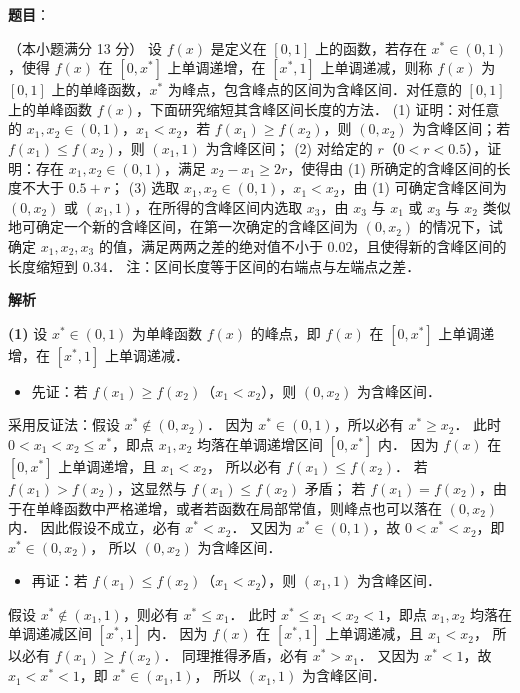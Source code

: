 \begin{answer}

\textbf{题目}：

（本小题满分 13 分）
设 $f(x)$ 是定义在 $[0, 1]$ 上的函数，若存在 $x^* \in (0, 1)$，使得 $f(x)$ 在 $[0, x^*]$ 上单调递增，在 $[x^*, 1]$ 上单调递减，则称 $f(x)$ 为 $[0, 1]$ 上的单峰函数，$x^*$ 为峰点，包含峰点的区间为含峰区间．对任意的 $[0, 1]$ 上的单峰函数 $f(x)$，下面研究缩短其含峰区间长度的方法．
(1) 证明：对任意的 $x_1, x_2 \in (0, 1)$，$x_1 < x_2$，若 $f(x_1) \geqslant f(x_2)$，则 $(0, x_2)$ 为含峰区间；若 $f(x_1) \leqslant f(x_2)$，则 $(x_1, 1)$ 为含峰区间；
(2) 对给定的 $r$（$0 < r < 0.5$），证明：存在 $x_1, x_2 \in (0, 1)$，满足 $x_2 - x_1 \geqslant 2r$，使得由 (1) 所确定的含峰区间的长度不大于 $0.5 + r$；
(3) 选取 $x_1, x_2 \in (0, 1)$，$x_1 < x_2$，由 (1) 可确定含峰区间为 $(0, x_2)$ 或 $(x_1, 1)$，在所得的含峰区间内选取 $x_3$，由 $x_3$ 与 $x_1$ 或 $x_3$ 与 $x_2$ 类似地可确定一个新的含峰区间，在第一次确定的含峰区间为 $(0, x_2)$ 的情况下，试确定 $x_1, x_2, x_3$ 的值，满足两两之差的绝对值不小于 $0.02$，且使得新的含峰区间的长度缩短到 $0.34$．
注：区间长度等于区间的右端点与左端点之差．

\textbf{解析}

\textbf{(1)}
设 $x^* \in (0, 1)$ 为单峰函数 $f(x)$ 的峰点，即 $f(x)$ 在 $[0, x^*]$ 上单调递增，在 $[x^*, 1]$ 上单调递减．
\begin{itemize}
\item 先证：若 $f(x_1) \geqslant f(x_2)$（$x_1 < x_2$），则 $(0, x_2)$ 为含峰区间．
\end{itemize}
  采用反证法：假设 $x^* \notin (0, x_2)$．
  因为 $x^* \in (0, 1)$，所以必有 $x^* \geqslant x_2$．
  此时 $0 < x_1 < x_2 \leqslant x^*$，即点 $x_1, x_2$ 均落在单调递增区间 $[0, x^*]$ 内．
  因为 $f(x)$ 在 $[0, x^*]$ 上单调递增，且 $x_1 < x_2$，
  所以必有 $f(x_1) \leqslant f(x_2)$．
  若 $f(x_1) > f(x_2)$，这显然与 $f(x_1) \leqslant f(x_2)$ 矛盾；
  若 $f(x_1) = f(x_2)$，由于在单峰函数中严格递增，或者若函数在局部常值，则峰点也可以落在 $(0, x_2)$ 内．
  因此假设不成立，必有 $x^* < x_2$．
  又因为 $x^* \in (0, 1)$，故 $0 < x^* < x_2$，即 $x^* \in (0, x_2)$，
  所以 $(0, x_2)$ 为含峰区间．
\begin{itemize}
\item 再证：若 $f(x_1) \leqslant f(x_2)$（$x_1 < x_2$），则 $(x_1, 1)$ 为含峰区间．
\end{itemize}
  假设 $x^* \notin (x_1, 1)$，则必有 $x^* \leqslant x_1$．
  此时 $x^* \leqslant x_1 < x_2 < 1$，即点 $x_1, x_2$ 均落在单调递减区间 $[x^*, 1]$ 内．
  因为 $f(x)$ 在 $[x^*, 1]$ 上单调递减，且 $x_1 < x_2$，
  所以必有 $f(x_1) \geqslant f(x_2)$．
  同理推得矛盾，必有 $x^* > x_1$．
  又因为 $x^* < 1$，故 $x_1 < x^* < 1$，即 $x^* \in (x_1, 1)$，
  所以 $(x_1, 1)$ 为含峰区间．


\end{answer}
